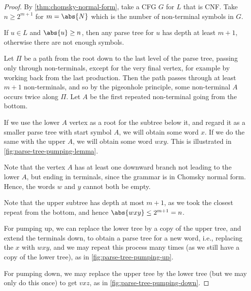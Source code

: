 \begin{proof}
    By \autoref{thm:chomsky-normal-form}, take a CFG \(G\) for \(L\) that is CNF. Take \(n \geq 2^{m + 1}\) for \(m = \abs{N}\) which is the number of non-terminal symbols in \(G\).

    If \(u \in L\) and \(\abs{u} \geq n\), then any parse tree for \(u\) has depth at least \(m + 1\), otherwise there are not enough symbols.

    Let \(\Pi\) be a path from the root down to the last level of the parse tree, passing only through non-terminals, except for the very final vertex, for example by working back from the last production. Then the path passes through at least \(m + 1\) non-terminals, and so by the pigeonhole principle, some non-terminal \(A\) occurs twice along \(\Pi\). Let \(A\) be the first repeated non-terminal going from the bottom.

    If we use the lower \(A\) vertex as a root for the subtree below it, and regard it as a smaller parse tree with start symbol \(A\), we will obtain some word \(x\). If we do the same with the upper \(A\), we will obtain some word \(w x y\). This is illustrated in \autoref{fig:parse-tree-pumping-lemma}.

    Note that the vertex \(A\) has at least one downward branch not leading to the lower \(A\), but ending in terminals, since the grammar is in Chomsky normal form. Hence, the words \(w\) and \(y\) cannot both be empty.

    Note that the upper subtree has depth at most \(m + 1\), as we took the closest repeat from the bottom, and hence \(\abs{w x y} \leq 2^{m + 1} = n\).

    For pumping up, we can replace the lower tree by a copy of the upper tree, and extend the terminals down, to obtain a parse tree for a new word, i.e., replacing the \(x\) with \(w x y\), and we may repeat this process many times (as we still have a copy of the lower tree), as in \autoref{fig:parse-tree-pumping-up}.

    For pumping down, we may replace the upper tree by the lower tree (but we may only do this once) to get \(v x z\), as in \autoref{fig:parse-tree-pumping-down}.
\end{proof}

